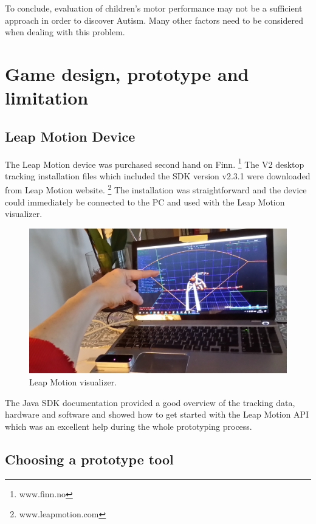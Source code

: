To conclude, evaluation of children's motor performance may not be a sufficient approach in order to discover Autism. Many other factors need to be considered when dealing with this problem. 



\section{Game design, prototype and limitation}
\label{sec:prototype}


\subsection{Leap Motion Device}

The Leap Motion device was purchased second hand on Finn. \footnote{www.finn.no} The V2 desktop tracking installation files which included the SDK version v2.3.1 were downloaded from Leap Motion website. \footnote{ www.leapmotion.com} The installation was straightforward and the device could immediately be connected to the PC and used with the Leap Motion visualizer.

\begin{figure}[h]  %
  \centering
  \includegraphics[width=.5\textwidth]{figures/LMvisualizer.jpg}
  \caption[Leap Motion visualizer.]{Leap Motion visualizer.}
  \label{fig:setup}
\end{figure}

The Java SDK documentation provided a good overview of the tracking data, hardware and software and showed how to get started with the Leap Motion API which was an excellent help during the whole prototyping process.

\subsection{Choosing a prototype tool}

